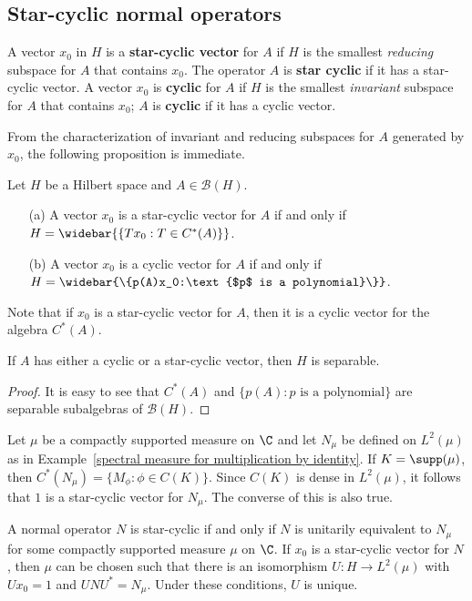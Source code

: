 \subsection{Star-cyclic normal operators}
\begin{definition}
A vector $x_0$ in $H$ is a \textbf{star-cyclic vector} for $A$ if $H$ is the smallest \textit{reducing} subspace for $A$ that contains $x_0$. The operator $A$ is \textbf{star cyclic} if it has a star-cyclic vector. A vector $x_0$ is \textbf{cyclic} for $A$ if $H$ is the smallest \textit{invariant} subspace for $A$ that contains $x_0$; $A$ is \textbf{cyclic} if it has a cyclic vector.
\end{definition}
From the characterization of invariant and reducing subspaces for $A$ generated by $x_0$, the following proposition is immediate.
\begin{proposition}
Let $H$ be a Hilbert space and $A\in\mathcal{B}(H)$.
\begin{itemize}
\item[(a)] A vector $x_0$ is a star-cyclic vector for $A$ if and only if $H=\widebar{\{Tx_0:T\in C^*(A)\}}$.
\item[(b)] A vector $x_0$ is a cyclic vector for $A$ if and only if $H=\widebar{\{p(A)x_0:\text{$p$ is a polynomial}\}}$.
\end{itemize}
\end{proposition}
Note that if $x_0$ is a star-cyclic vector for $A$, then it is a cyclic vector for the algebra $C^*(A)$.
\begin{proposition}
If $A$ has either a cyclic or a star-cyclic vector, then $H$ is separable.
\end{proposition}
\begin{proof}
It is easy to see that $C^*(A)$ and $\{p(A):\text{$p$ is a polynomial}\}$ are separable subalgebras of $\mathcal{B}(H)$.
\end{proof}
Let $\mu$ be a compactly supported measure on $\C$ and let $N_\mu$ be defined on $L^2(\mu)$ as in Example~\ref{spectral measure for multiplication by identity}. If $K=\supp(\mu)$, then $C^*(N_\mu)=\{M_\phi:\phi\in C(K)\}$. Since $C(K)$ is dense in $L^2(\mu)$, it follows that $1$ is a star-cyclic vector for $N_\mu$. The converse of this is also true.
\begin{theorem}\label{Hilbert space normal operator star-cyclic iff}
A normal operator $N$ is star-cyclic if and only if $N$ is unitarily equivalent to $N_\mu$ for some compactly supported measure $\mu$ on $\C$. If $x_0$ is a star-cyclic vector for $N$, then $\mu$ can be chosen such that there is an isomorphism $U:H\to L^2(\mu)$ with $Ux_0=1$ and $UNU^*=N_\mu$. Under these conditions, $U$ is unique.
\end{theorem}
